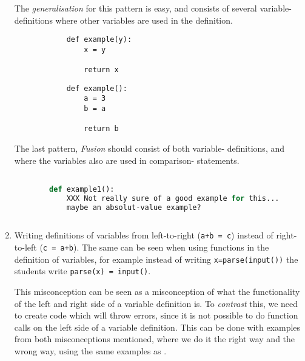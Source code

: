 \begin{enumerate}
      The \emph{generalisation} for this pattern is easy, and consists of 
several variable-definitions where other variables are used in the 
definition. 

      \hfill
     \begin{minipage}[t]{0.45\columnwidth}
        \begin{verbatim}
            def example(y):
                x = y
    
                return x   
        \end{verbatim}
    \end{minipage}
\hfill
    \begin{minipage}[t]{0.45\columnwidth}
        \begin{verbatim}
            def example():
                a = 3
                b = a
    
                return b
        \end{verbatim}
    \end{minipage}
\hfill
     
      
      The last pattern, \emph{Fusion} should consist of both variable-
definitions, and where the variables also are used in comparison-
statements. 

      \begin{lstlisting}[language=Python]

        def example1():
            XXX Not really sure of a good example for this... 
            maybe an absolut-value example?
                
    \end{lstlisting}
    \item Writing definitions of variables from left-to-right 
      (\texttt{a+b = c}) instead of right-to-left 
      (\texttt{c = a+b}). The same can be seen when using 
functions 
      in the definition of variables, for example instead of writing 
      \texttt{x=parse(input())} the students write 
      \texttt{parse(x) = input()}.

      This misconception can be seen as a misconception of what the 
functionality of the left and right side of a variable definition is. 
To \emph{contrast} this, we need to create code which will throw 
errors, since it is not possible to do function calls on the left 
side of a variable definition. This can be done with examples from 
both misconceptions mentioned, where we do it the right way and the 
wrong way, using the same examples as \textcite{GuoMarkelZhang2020}.


\end{enumerate}

